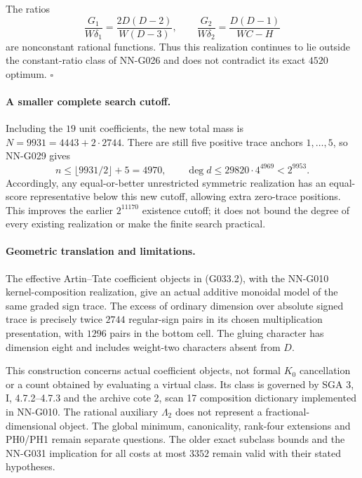 The ratios
\[
 \frac{G_1}{W\delta_1}
   =\frac{2D(D-2)}{W(D-3)},\qquad
 \frac{G_2}{W\delta_2}=\frac{D(D-1)}{WC-H}
\]
are nonconstant rational functions. Thus this realization
continues to lie outside the constant-ratio class of
NN-G026 and does not contradict its exact $4520$ optimum.
\hfill$\square$

\paragraph{A smaller complete search cutoff.}
Including the $19$ unit coefficients, the new total mass
is $N=9931=4443+2\cdot2744$. There are still five positive
trace anchors $1,\ldots,5$, so NN-G029 gives
\[
 n\le\lfloor9931/2\rfloor+5=4970,\qquad
 \deg d\le29820\cdot4^{4969}<2^{9953}.              \tag{G033.4}
\]
Accordingly, any equal-or-better unrestricted symmetric
realization has an equal-score representative below
this new cutoff, allowing extra zero-trace positions.
This improves the earlier $2^{11170}$ existence cutoff;
it does not bound the degree of every existing realization
or make the finite search practical.

\paragraph{Geometric translation and limitations.}
The effective Artin--Tate coefficient objects in
(G033.2), with the NN-G010 kernel-composition realization,
give an actual additive monoidal model of the same
graded sign trace. The excess of ordinary dimension
over absolute signed trace is precisely twice $2744$
regular-sign pairs in its chosen multiplication
presentation, with $1296$ pairs in the bottom cell.
The gluing character has dimension eight and includes
weight-two characters absent from $D$.

This construction concerns actual coefficient objects,
not formal $K_0$ cancellation or a count obtained by
evaluating a virtual class. Its class is governed by
SGA 3, I, 4.7.2--4.7.3 and the archive cote 2, scan 17
composition dictionary implemented in NN-G010.
The rational auxiliary $\Lambda_2$ does not represent
a fractional-dimensional object. The global minimum,
canonicality, rank-four extensions and PH0/PH1 remain
separate questions. The older exact subclass bounds
and the NN-G031 implication for all costs at most
$3352$ remain valid with their stated hypotheses.

